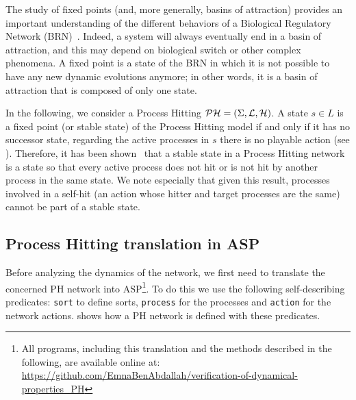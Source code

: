 The study of fixed points (and, more generally, basins of attraction) provides an important understanding of the different behaviors of a Biological Regulatory Network (BRN)~\cite{wuensche1998genomic}.
Indeed, a system will always eventually end in a basin of attraction,
and this may depend on biological switch or other complex phenomena.
A fixed point is a state of the BRN in which it is not possible to have any new dynamic evolutions anymore;
in other words, it is a basin of attraction that is composed of only one state.

In the following, we consider a Process Hitting $\mathcal{PH} = (\Sigma, \mathcal{L}, \mathcal{H})$.
A state $s \in L$ is a fixed point (or stable state) of the Process Hitting model if and only if it has no successor state, \ie regarding the active processes in $s$ there is no playable action (see ).
Therefore, it has been shown~\cite{PMR10-TCSB} that
a stable state in a Process Hitting network is a state so that
every active process does not hit or is not hit by another process in the same state.
We note especially that given this result, processes involved in a self-hit (an action whose hitter and target processes are the same) cannot be part of a stable state.

\subsection{Process Hitting translation in ASP}
Before analyzing the dynamics of the network,
we first need to translate the concerned PH network into ASP\footnote{All programs, including this translation and the methods described in the following, are available online at: \url{https://github.com/EmnaBenAbdallah/verification-of-dynamical-properties_PH}}.
To do this we use the following self-describing predicates:
\texttt{sort} to define sorts, \texttt{process} for the processes and \texttt{action} for the network actions.
 shows how a PH network is defined with these predicates.

